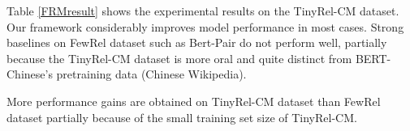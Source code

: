 
Table \ref{FRMresult} shows the experimental results on the TinyRel-CM dataset.
Our framework considerably improves model performance in most cases.
Strong baselines on FewRel dataset such as Bert-Pair do not perform well, partially because the TinyRel-CM dataset is more oral and quite distinct from BERT-Chinese's pretraining data (Chinese Wikipedia).

More performance gains are obtained on TinyRel-CM dataset than FewRel dataset partially because of the small training set size of TinyRel-CM. %

